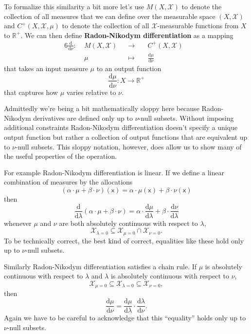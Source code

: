 \documentclass[
  letterpaper,
  DIV=11,
  numbers=noendperiod]{scrartcl}
\begin{document}
To formalize this similarity a bit more let's use \(M(X, \mathcal{X})\)
to denote the collection of all measures that we can define over the
measurable space \((X, \mathcal{X})\) and \(C^{+}(X, \mathcal{X}, \mu)\)
to denote the collection of all \(\mathcal{X}\)-measurable functions
from \(X\) to \(\mathbb{R}^{+}\). We can then define
\textbf{Radon-Nikodym differentiation} as a mapping \begin{alignat*}{6}
\frac{ \mathrm{d} }{ \mathrm{d} \nu } :\; & M(X, \mathcal{X}) & &\rightarrow& \;
& C^{+}(X, \mathcal{X}) &
\\
& \mu & &\mapsto& & \frac{ \mathrm{d} \mu }{ \mathrm{d} \nu } &
\end{alignat*} that takes an input measure \(\mu\) to an output function
\[
\frac{ \mathrm{d} \mu }{ \mathrm{d} \nu } : X \rightarrow \mathbb{R}^{+}
\] that captures how \(\mu\) varies relative to \(\nu\).

Admittedly we're being a bit mathematically sloppy here because
Radon-Nikodym derivatives are defined only up to \(\nu\)-null subsets.
Without imposing additional constraints Radon-Nikodym differentiation
doesn't specify a unique output function but rather a collection of
output functions that are equivalent up to \(\nu\)-null subsets. This
sloppy notation, however, does allow us to show many of the useful
properties of the operation.

For example Radon-Nikodym differentiation is linear. If we define a
linear combination of measures by the allocations \[
(\alpha \cdot \mu + \beta \cdot \nu)(\mathsf{x})
=
\alpha \cdot \mu(\mathsf{x}) + \beta \cdot \nu(\mathsf{x})
\] then \[
\frac{ \mathrm{d} }{ \mathrm{d} \lambda }
(\alpha \cdot \mu + \beta \cdot \nu)
=
\alpha \cdot \frac{ \mathrm{d} \mu}{ \mathrm{d} \lambda }
+ \beta \cdot \frac{ \mathrm{d} \nu }{ \mathrm{d} \lambda }
\] whenever \(\mu\) and \(\nu\) are both absolutely continuous with
respect to \(\lambda\), \[
\mathcal{X}_{\lambda = 0} \subseteq
\mathcal{X}_{\mu = 0} \cap \mathcal{X}_{\nu = 0}.
\] To be technically correct, the best kind of correct, equalities like
these hold only up to \(\nu\)-null subsets.

Similarly Radon-Nikodym differentiation satisfies a chain rule. If
\(\mu\) is absolutely continuous with respect to \(\lambda\) and
\(\lambda\) is absolutely continuous with respect to \(\nu\), \[
\mathcal{X}_{\mu = 0}
\subseteq \mathcal{X}_{\lambda = 0}
\subseteq \mathcal{X}_{\nu = 0},
\] then \[
\frac{ \mathrm{d} \mu}{ \mathrm{d} \nu}
=
\frac{ \mathrm{d} \mu}{ \mathrm{d} \lambda } \cdot
\frac{ \mathrm{d} \lambda}{ \mathrm{d} \nu }.
\] Again we have to be careful to acknowledge that this ``equality''
holds only up to \(\nu\)-null subsets.
\end{document}
